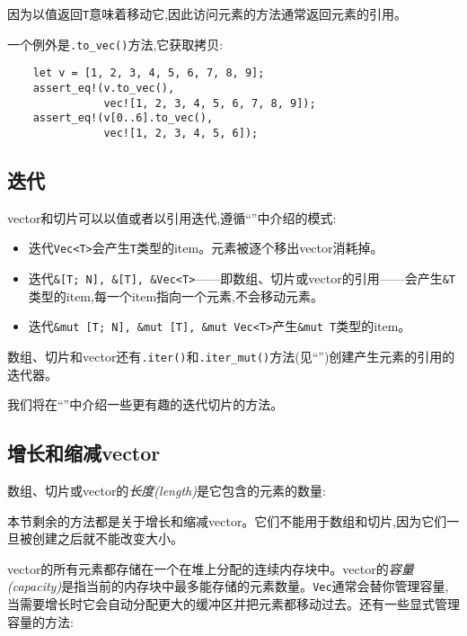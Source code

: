 因为以值返回\texttt{T}意味着移动它,因此访问元素的方法通常返回元素的引用。

一个例外是\texttt{.to\_vec()}方法,它获取拷贝:

\begin{verbatim}
    let v = [1, 2, 3, 4, 5, 6, 7, 8, 9];
    assert_eq!(v.to_vec(),
               vec![1, 2, 3, 4, 5, 6, 7, 8, 9]);
    assert_eq!(v[0..6].to_vec(),
               vec![1, 2, 3, 4, 5, 6]);
\end{verbatim}

\subsection{迭代}\label{Iteration}
vector和切片可以以值或者以引用迭代,遵循“”中介绍的模式:
\begin{itemize}
    \item 迭代\texttt{Vec<T>}会产生\texttt{T}类型的item。元素被逐个移出vector消耗掉。
    \item 迭代\texttt{\&[T; N], \&[T], \&Vec<T>}——即数组、切片或vector的引用——会产生\texttt{\&T}类型的item,每一个item指向一个元素,不会移动元素。
    \item 迭代\texttt{\&mut [T; N], \&mut [T], \&mut Vec<T>}产生\texttt{\&mut T}类型的item。
\end{itemize}

数组、切片和vector还有\texttt{.iter()}和\texttt{.iter\_mut()}方法(见“”)创建产生元素的引用的迭代器。

我们将在“”中介绍一些更有趣的迭代切片的方法。

\subsection{增长和缩减vector}
数组、切片或vector的\emph{长度(length)}是它包含的元素的数量:



本节剩余的方法都是关于增长和缩减vector。它们不能用于数组和切片,因为它们一旦被创建之后就不能改变大小。

vector的所有元素都存储在一个在堆上分配的连续内存块中。vector的\emph{容量(capacity)}是指当前的内存块中最多能存储的元素数量。\texttt{Vec}通常会替你管理容量,当需要增长时它会自动分配更大的缓冲区并把元素都移动过去。还有一些显式管理容量的方法:

